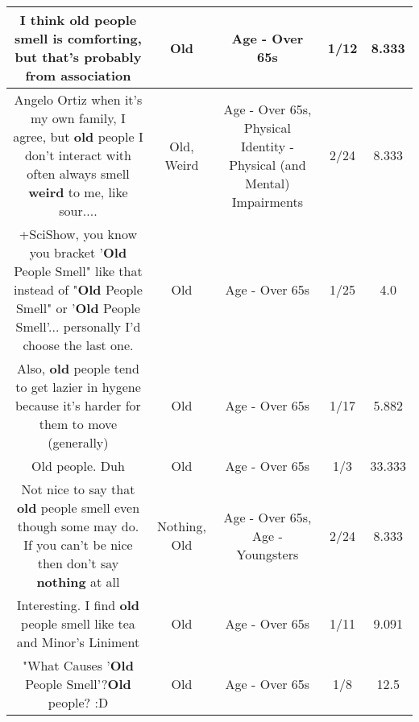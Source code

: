 \documentclass[11pt]{article}
\newlength\mylength
\begin{document}
\begin{center}
\begin{longtable}{|C{.65\mylength}|C{.30\mylength}|C{.12\mylength}|C{.12\mylength}|C{.12\mylength}|}
  \small I think \textbf{old} people smell is comforting, but that's probably from association\normalsize   & Old & Age - Over 65s & 1/12 & 8.333 \\  \hline
  \small Angelo Ortiz when it's my own family, I agree, but \textbf{old} people I don't interact with often always smell \textbf{weird} to me, like sour....\normalsize   & Old, Weird & Age - Over 65s, Physical Identity - Physical (and Mental) Impairments & 2/24 & 8.333 \\  \hline
  \small +SciShow, you know you bracket '\textbf{Old} People Smell" like that instead of "\textbf{Old} People Smell" or '\textbf{Old} People Smell'... personally I'd choose the last one.\normalsize   & Old & Age - Over 65s & 1/25 & 4.0 \\  \hline
  \small Also, \textbf{old} people tend to get lazier in hygene because it's harder for them to move (generally)\normalsize   & Old & Age - Over 65s & 1/17 & 5.882 \\  \hline
  \small Old people. Duh\normalsize   & Old & Age - Over 65s & 1/3 & 33.333 \\  \hline
  \small Not nice to say that \textbf{old} people smell even though some may do. If you can't be nice then don't say \textbf{nothing} at all\normalsize   & Nothing, Old & Age - Over 65s, Age - Youngsters & 2/24 & 8.333 \\  \hline
  \small Interesting. I find \textbf{old} people smell like tea and Minor's Liniment\normalsize   & Old & Age - Over 65s & 1/11 & 9.091 \\  \hline
  \small "What Causes '\textbf{Old} People Smell'?\textbf{Old} people? :D\normalsize   & Old & Age - Over 65s & 1/8 & 12.5 \\  \hline

\end{longtable}
\end{center}
\end{document}
